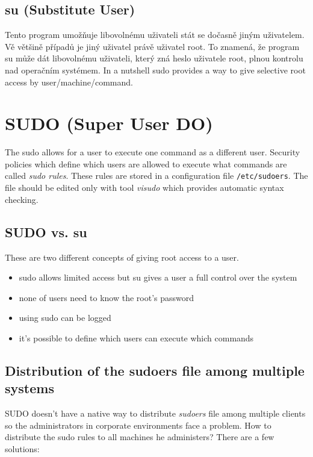 \documentclass[12pt,a4paper,titlepage,final]{article}
\begin{document}
\subsection{su (Substitute User)}
Tento program umožňuje libovolnému uživateli stát se dočasně jiným uživatelem.
Vě většině případů je jiný uživatel právě uživatel root. To znamená, že program
su může dát libovolnému uživateli, který zná heslo uživatele root, plnou
kontrolu nad operačním systémem. In a nutshell sudo provides a way to give
selective root access by user/machine/command.


\section{SUDO (Super User DO)}

The sudo allows for a user to execute one command as a different user. Security
policies which define which users are allowed to execute what commands are
called \emph{sudo rules}. These rules are stored in a configuration file
\texttt{/etc/sudoers}. The file should be edited only with tool \emph{visudo}
which provides automatic syntax checking.

\subsection{SUDO vs. su}
These are two different concepts of giving root access to a user.

\begin{itemize}
	\item sudo allows limited access but su gives a user a full control over the
		system
	\item none of users need to know the root's password
	\item using sudo can be logged
	\item it's possible to define which users can execute which commands
\end{itemize}


\subsection{Distribution of the sudoers file among multiple systems}
SUDO doesn't have a native way to distribute \emph{sudoers} file among multiple
clients so the administrators in corporate environments face a problem. How to
distribute the sudo rules to all machines he administers? There are a few
solutions:
\end{document}
